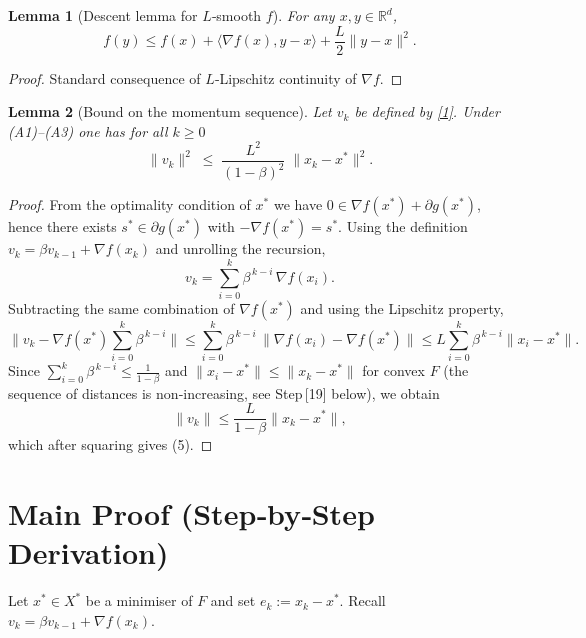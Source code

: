 \documentclass{article}
\newtheorem{lemma}{Lemma}
\newcommand{\R}{\mathbb{R}}
\begin{document}
\begin{lemma}[Descent lemma for $L$‑smooth $f$]\label{lem:descent}
For any $x,y\in\R^{d}$,
\[
f(y)\le f(x)+\langle\nabla f(x),y-x\rangle+\frac{L}{2}\|y-x\|^{2}.
\tag{4}
\]
\end{lemma}
\begin{proof}
Standard consequence of $L$‑Lipschitz continuity of $\nabla f$. \qedhere
\end{proof}

\begin{lemma}[Bound on the momentum sequence]\label{lem:momentum}
Let $v_{k}$ be defined by \eqref{1}.  Under (A1)–(A3) one has for all $k\ge0$
\[
\|v_{k}\|^{2}\;\le\;\frac{L^{2}}{(1-\beta)^{2}}\;\|x_{k}-x^{*}\|^{2}.
\tag{5}
\]
\end{lemma}
\begin{proof}
From the optimality condition of $x^{*}$ we have $0\in \nabla f(x^{*})+\partial g(x^{*})$,
hence there exists $s^{*}\in\partial g(x^{*})$ with $-\nabla f(x^{*})=s^{*}$.
Using the definition $v_{k}= \beta v_{k-1}+ \nabla f(x_{k})$ and unrolling the recursion,
\[
v_{k}= \sum_{i=0}^{k}\beta^{\,k-i}\,\nabla f(x_{i}).
\]
Subtracting the same combination of $\nabla f(x^{*})$ and using the Lipschitz property,
\[
\bigl\|v_{k}-\nabla f(x^{*})\sum_{i=0}^{k}\beta^{\,k-i}\bigr\|
   \le \sum_{i=0}^{k}\beta^{\,k-i}\,\|\nabla f(x_{i})-\nabla f(x^{*})\|
   \le L\sum_{i=0}^{k}\beta^{\,k-i}\|x_{i}-x^{*}\|.
\]
Since $\sum_{i=0}^{k}\beta^{\,k-i}\le \frac{1}{1-\beta}$ and $\|x_{i}-x^{*}\|\le\|x_{k}-x^{*}\|$ for convex $F$ (the sequence of distances is non‑increasing, see Step [19] below), we obtain
\[
\|v_{k}\|\le \frac{L}{1-\beta}\|x_{k}-x^{*}\|,
\]
which after squaring gives (5). \qedhere
\end{proof}

\section*{Main Proof (Step‑by‑Step Derivation)}
Let $x^{*}\in X^{*}$ be a minimiser of $F$ and set $e_{k}:=x_{k}-x^{*}$.
Recall $v_{k}= \beta v_{k-1}+ \nabla f(x_{k})$.
\end{document}
